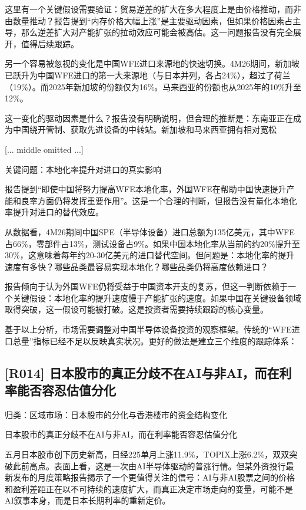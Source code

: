 \documentclass[11pt]{ctexart}
\begin{document}
这里有一个关键假设需要验证：贸易逆差的扩大在多大程度上是由价格推动，而非由数量推动？报告提到“内存价格大幅上涨”是主要驱动因素，但如果价格因素占主导，那么逆差扩大对产能扩张的拉动效应可能会被高估。这一问题报告没有完全展开，值得后续跟踪。

另一个容易被忽视的变化是中国WFE进口来源地的快速切换。4M26期间，新加坡已跃升为中国WFE进口的第一大来源地（与日本并列，各占24\%），超过了荷兰（19\%）。而2025年新加坡的份额仅为16\%。马来西亚的份额也从2025年的10\%升至12\%。

这一变化的驱动因素是什么？报告没有明确说明，但合理的推断是：东南亚正在成为中国绕开管制、获取先进设备的中转站。新加坡和马来西亚拥有相对宽松

[... middle omitted ...]

关键问题：本地化率提升对进口的真实影响

报告提到“即使中国将努力提高WFE本地化率，外国WFE在帮助中国快速提升产能和良率方面仍将发挥重要作用”。这是一个合理的判断，但报告没有量化本地化率提升对进口的替代效应。

从数据看，4M26期间中国SPE（半导体设备）进口总额为135亿美元，其中WFE占66\%，零部件占13\%，测试设备占9\%。如果中国本地化率从当前的约20\%提升至30\%，这意味着每年约20-30亿美元的进口替代空间。但问题是：本地化率的提升速度有多快？哪些品类最容易实现本地化？哪些品类仍将高度依赖进口？

报告倾向于认为外国WFE仍将受益于中国资本开支的复苏，但这一判断依赖于一个关键假设：本地化率的提升速度慢于产能扩张的速度。如果中国在关键设备领域取得突破，这一假设可能被打破。这是投资者需要持续跟踪的核心变量。

基于以上分析，市场需要调整对中国半导体设备投资的观察框架。传统的“WFE进口总量”指标已经不足以反映真实状况。更好的做法是建立三个维度的跟踪体系：

\subsection{[R014] 日本股市的真正分歧不在AI与非AI，而在利率能否容忍估值分化}
{\small\color{refgray}归类：区域市场：日本股市的分化与香港楼市的资金结构变化}

日本股市的真正分歧不在AI与非AI，而在利率能否容忍估值分化

五月日本股市创下历史新高，日经225单月上涨11.9\%，TOPIX上涨6.2\%，双双突破此前高点。表面上看，这是一次由AI半导体驱动的普涨行情。但某外资投行最新发布的月度策略报告揭示了一个更值得关注的信号：AI与非AI股票之间的价格和盈利差距正在以不可持续的速度扩大，而真正决定市场走向的变量，可能不是AI叙事本身，而是日本长期利率的重新定价。
\end{document}
